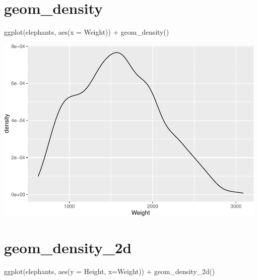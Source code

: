 \documentclass[
]{book}
\newenvironment{Shaded}{\begin{snugshade}}{\end{snugshade}}
\newcommand{\AttributeTok}[1]{\textcolor[rgb]{0.77,0.63,0.00}{#1}}
\newcommand{\FunctionTok}[1]{\textcolor[rgb]{0.00,0.00,0.00}{#1}}
\newcommand{\NormalTok}[1]{#1}
\newcommand{\SpecialCharTok}[1]{\textcolor[rgb]{0.00,0.00,0.00}{#1}}
\begin{document}
\hypertarget{geom_density}{%
\section{geom\_density}\label{geom_density}}

\begin{Shaded}
\begin{Highlighting}[]
\FunctionTok{ggplot}\NormalTok{(elephants, }\FunctionTok{aes}\NormalTok{(}\AttributeTok{x =}\NormalTok{ Weight)) }\SpecialCharTok{+} 
  \FunctionTok{geom\_density}\NormalTok{()}
\end{Highlighting}
\end{Shaded}

\includegraphics{Data-Visualisation-geom-Encyclopedia_files/figure-latex/unnamed-chunk-31-1.pdf}

\hypertarget{geom_density_2d}{%
\section{geom\_density\_2d}\label{geom_density_2d}}

\begin{Shaded}
\begin{Highlighting}[]
\FunctionTok{ggplot}\NormalTok{(elephants, }\FunctionTok{aes}\NormalTok{(}\AttributeTok{y =}\NormalTok{ Height, }\AttributeTok{x=}\NormalTok{Weight)) }\SpecialCharTok{+} 
  \FunctionTok{geom\_density\_2d}\NormalTok{()}
\end{Highlighting}
\end{Shaded}
\end{document}
